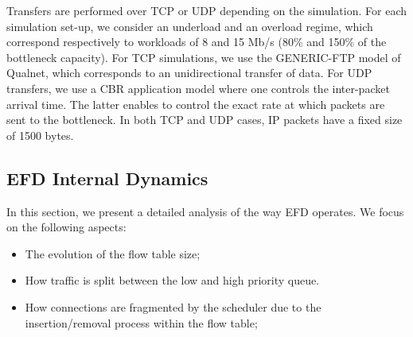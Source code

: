 \documentclass[preprint,12pt]{elsarticle}
\begin{document}
Transfers are performed over TCP or UDP depending on the simulation. For each simulation set-up, we consider an underload and an overload regime, which correspond respectively to workloads of 8 and 15 Mb/s (80\% and 150\% of the bottleneck capacity). For TCP simulations, we use the GENERIC-FTP model of Qualnet, which corresponds to an unidirectional transfer of data. For UDP transfers, we use a CBR application model where one controls the inter-packet arrival time. The latter enables to control the exact rate at which packets are sent to the bottleneck. In both TCP and UDP cases, IP packets have a fixed size of 1500 bytes.


\subsection{EFD Internal Dynamics }


In this section, we present a detailed analysis of the way EFD operates. We focus on the following aspects:
\begin{itemize}
\item The evolution of the flow table size;
\item How traffic is split between the low and high priority queue.
\item  How connections are fragmented by the scheduler due to the insertion/removal process within the flow table;
\end{itemize}



\end{document}
